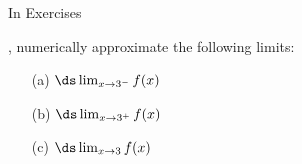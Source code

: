 {\noindent In Exercises}
{, numerically approximate the following limits:
	\begin{enumerate}
	\item[(a)]		$\ds \lim_{x\to 3^-} f(x)$
	\item[(b)]		$\ds \lim_{x\to 3^+} f(x)$
	\item[(c)]		$\ds \lim_{x\to 3} f(x)$
	\end{enumerate}
}
